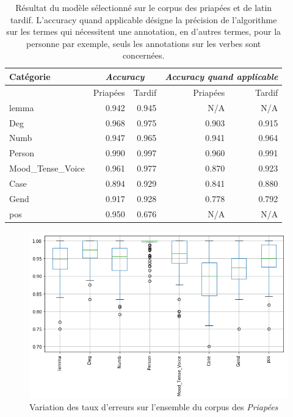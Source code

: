 \begin{table}[h]
    \centering
    \begin{tabular}{l|rr|rr}
    \toprule
         Catégorie &  \multicolumn{2}{c}{\textit{Accuracy}} & \multicolumn{2}{c}{\textit{Accuracy quand applicable}} \\
    \midrule    
                {} &  Priapées &    Tardif                  & Priapées &    Tardif                                   \\
    \midrule
             lemma &     0.942 &    0.945                   &   N/A    &    N/A                                      \\
               Deg &     0.968 &    0.975                   &   0.903  &    0.915                                    \\
              Numb &     0.947 &    0.965                   &   0.941  &    0.964                                    \\
            Person &     0.990 &    0.997                   &   0.960  &    0.991                                    \\
Mood\_Tense\_Voice &     0.961 &    0.977                   &   0.870  &    0.923                                    \\
              Case &     0.894 &    0.929                   &   0.841  &    0.880                                    \\
              Gend &     0.917 &    0.928                   &   0.778  &    0.792                                    \\
               pos &     0.950 &    0.676                   &   N/A    &    N/A                                      \\
    \bottomrule
    \end{tabular}
    \caption{Résultat du modèle sélectionné sur le corpus des priapées et de latin tardif. L'accuracy quand applicable désigne la précision de l'algorithme sur les termes qui nécessitent une annotation, en d'autres termes, pour la personne par exemple, seuls les annotations sur les verbes sont concernées.}
    \label{tab:out_of_domain_global_accuracy}
\end{table}


\begin{figure}[ht]
    \centering
    \includegraphics[width=0.7\linewidth]{results/lemmatisation/extensibilite/PriapeaBoxPlot.png}
    \caption{Variation des taux d'erreurs sur l'ensemble du corpus des \textit{Priapées}}
    \label{fig:priapea_varations_boxplot}
\end{figure}

